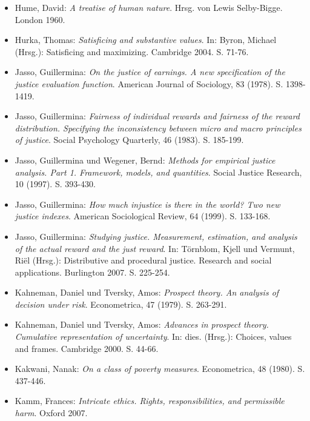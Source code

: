 \documentclass[a4paper]{thesis}
\begin{document}
\begin{itemize}[leftmargin=1.5em,label={},itemindent=-1.5em, itemsep=-1ex]
\item Hume, David: \textit{A treatise of human nature}. Hrsg. von Lewis Selby-Bigge. London 1960.

\item Hurka, Thomas: \textit{Satisficing and substantive values}. In: Byron, Michael (Hrsg.): Satisficing and maximizing. Cambridge 2004. S. 71-76.

\item Jasso, Guillermina: \textit{On the justice of earnings. A new specification of the justice evaluation function}. American Journal of Sociology, 83 (1978). S. 1398-1419.

\item Jasso, Guillermina: \textit{Fairness of individual rewards and fairness of the reward distribution. Specifying the inconsistency between micro and macro principles of justice}. Social Psychology Quarterly, 46 (1983). S. 185-199.

\item Jasso, Guillermina und Wegener, Bernd: \textit{Methods for empirical justice analysis. Part 1. Framework, models, and quantities}. Social Justice Research, 10 (1997). S. 393-430.

\item Jasso, Guillermina: \textit{How much injustice is there in the world? Two new justice indexes}. American Sociological Review, 64 (1999). S. 133-168.

\item Jasso, Guillermina: \textit{Studying justice. Measurement, estimation, and analysis of the actual reward and the just reward}. In: Törnblom, Kjell und Vermunt, Riël (Hrsg.): Distributive and procedural justice. Research and social applications. Burlington 2007. S. 225-254.

\item Kahneman, Daniel und Tversky, Amos: \textit{Prospect theory. An analysis of decision under risk}. Econometrica, 47 (1979). S. 263-291.

\item Kahneman, Daniel und Tversky, Amos: \textit{Advances in prospect theory. Cumulative representation of uncertainty}. In: dies. (Hrsg.): Choices, values and frames. Cambridge 2000. S. 44-66.

\item Kakwani, Nanak: \textit{On a class of poverty measures}. Econometrica, 48 (1980). S. 437-446.

\item Kamm, Frances: \textit{Intricate ethics. Rights, responsibilities, and permissible harm}. Oxford 2007.


\end{itemize}
\end{document}
